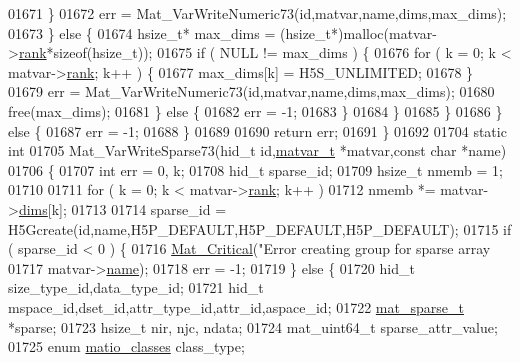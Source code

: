 \begin{DoxyCode}
{{01671                 \}
01672                 err = Mat\_VarWriteNumeric73(\textcolor{keywordtype}{id},matvar,name,dims,max\_dims);
01673             \} \textcolor{keywordflow}{else} \{
01674                 hsize\_t* max\_dims = (hsize\_t*)malloc(matvar->\hyperlink{group___m_a_t_a84ba70c96ded13cc555fa75b768d9921}{rank}*\textcolor{keyword}{sizeof}(hsize\_t));
01675                 \textcolor{keywordflow}{if} ( NULL != max\_dims ) \{
01676                     \textcolor{keywordflow}{for} ( k = 0; k < matvar->\hyperlink{group___m_a_t_a84ba70c96ded13cc555fa75b768d9921}{rank}; k++ ) \{
01677                         max\_dims[k] = H5S\_UNLIMITED;
01678                     \}
01679                     err = Mat\_VarWriteNumeric73(\textcolor{keywordtype}{id},matvar,name,dims,max\_dims);
01680                     free(max\_dims);
01681                 \} \textcolor{keywordflow}{else} \{
01682                     err = -1;
01683                 \}
01684             \}
01685         \}
01686     \} \textcolor{keywordflow}{else} \{
01687         err = -1;
01688     \}
01689 
01690     \textcolor{keywordflow}{return} err;
01691 \}
01692 
01704 \textcolor{keyword}{static} \textcolor{keywordtype}{int}
01705 Mat\_VarWriteSparse73(hid\_t \textcolor{keywordtype}{id},\hyperlink{group___m_a_t_structmatvar__t}{matvar\_t} *matvar,\textcolor{keyword}{const} \textcolor{keywordtype}{char} *name)
01706 \{
01707     \textcolor{keywordtype}{int} err = 0, k;
01708     hid\_t   sparse\_id;
01709     hsize\_t nmemb = 1;
01710 
01711     \textcolor{keywordflow}{for} ( k = 0; k < matvar->\hyperlink{group___m_a_t_a84ba70c96ded13cc555fa75b768d9921}{rank}; k++ )
01712         nmemb *= matvar->\hyperlink{group___m_a_t_a8e01234e1c862ce3472bb37f5a09b92c}{dims}[k];
01713 
01714     sparse\_id = H5Gcreate(\textcolor{keywordtype}{id},name,H5P\_DEFAULT,H5P\_DEFAULT,H5P\_DEFAULT);
01715     \textcolor{keywordflow}{if} ( sparse\_id < 0 ) \{
01716         \hyperlink{group__mat__util_gaf51f2bfbb5580f575e4dd79757e2b80c}{Mat\_Critical}(\textcolor{stringliteral}{"Error creating group for sparse array %
01717                      matvar->\hyperlink{group___m_a_t_a5d4b55b041e3b4fb50c04337f05ad909}{name});
01718         err = -1;
01719     \} \textcolor{keywordflow}{else} \{
01720         hid\_t size\_type\_id,data\_type\_id;
01721         hid\_t mspace\_id,dset\_id,attr\_type\_id,attr\_id,aspace\_id;
01722         \hyperlink{group___m_a_t_structmat__sparse__t}{mat\_sparse\_t} *sparse;
01723         hsize\_t nir, njc, ndata;
01724         mat\_uint64\_t sparse\_attr\_value;
01725         \textcolor{keyword}{enum} \hyperlink{group___m_a_t_gad4d60ae7b709fc81bfd744fb4c857c40}{matio\_classes} class\_type;
}}}
\end{DoxyCode}
